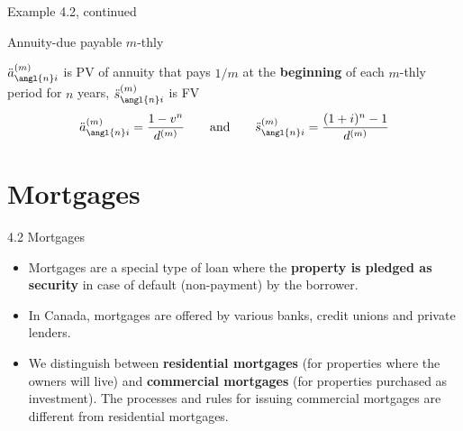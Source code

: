 \documentclass{beamer}
\begin{document}
\begin{frame}{Example 4.2, continued}

\begin{center}
\end{center}

\vfill
\end{frame}

\begin{frame}{Annuity-due payable $m$-thly}

\begin{center}
\end{center}

$\ddot{a}_{\angl{n}i}^{(m)}$ is PV of annuity that pays $1/m$ at the \textbf{beginning} of each $m$-thly period for $n$ years, $\ddot{s}_{\angl{n}i}^{(m)}$ is FV
\[
\ddot{a}_{\angl{n}i}^{(m)} = \frac{1-v^n}{d^{(m)}} \qquad \text{and} \qquad \ddot{s}_{\angl{n}i}^{(m)} = \frac{(1+i)^n - 1}{d^{(m)}}
\]

\end{frame}

\section{Mortgages}

\begin{frame}{4.2 Mortgages}

\begin{itemize}
\item Mortgages are a special type of loan where the \textbf{property is pledged as security} in case of default (non-payment) by the borrower.
\medskip
\item In Canada, mortgages are offered by various banks, credit unions and private lenders.
\medskip
\item We distinguish between \textbf{residential mortgages} (for properties where the owners will live) and \textbf{commercial mortgages} (for properties purchased as investment). The processes and rules for issuing commercial mortgages are different from residential mortgages.
\end{itemize}

\end{frame}
\end{document}
